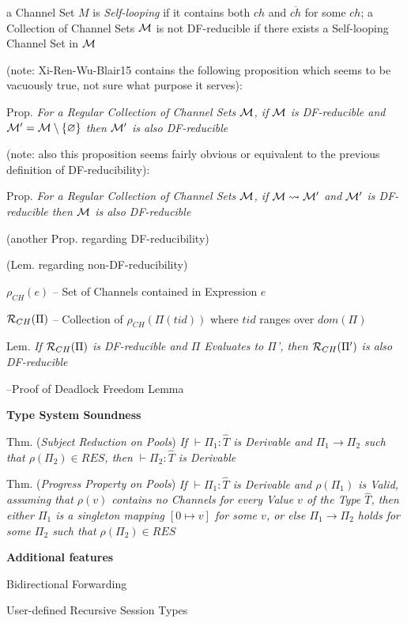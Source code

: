 a Channel Set $M$ is \emph{Self-looping} if it contains both $ch$ and
$\overline{ch}$ for some $ch$; a Collection of Channel Sets
$\mathcal{M}$ is not DF-reducible if there exists a Self-looping Channel
Set in $\mathcal{M}$

(note: Xi-Ren-Wu-Blair15 contains the following proposition which
seems to be vacuously true, not sure what purpose it serves):

Prop. \emph{For a Regular Collection of Channel Sets $\mathcal{M}$, if
  $\mathcal{M}$ is DF-reducible and $\mathcal{M}' =
  \mathcal{M}\setminus\{\varnothing\}$ then $\mathcal{M}'$ is also
  DF-reducible}

(note: also this proposition seems fairly obvious or equivalent to the
previous definition of DF-reducibility):

Prop. \emph{For a Regular Collection of Channel Sets $\mathcal{M}$, if
  $\mathcal{M} \rightsquigarrow \mathcal{M}'$ and $\mathcal{M}'$ is
  DF-reducible then $\mathcal{M}$ is also DF-reducible}

(another Prop. regarding DF-reducibility) %

(Lem. regarding non-DF-reducibility) %

$\rho_{CH}(e)$ -- Set of Channels contained in Expression $e$

$\mathcal{R}_{CH}(\Pi)$ -- Collection of $\rho_{CH}(\Pi(tid))$ where
$tid$ ranges over $dom(\Pi)$

Lem. \emph{If $\mathcal{R}_{CH}(\Pi)$ is DF-reducible and $\Pi$
  Evaluates to $\Pi$', then $\mathcal{R}_{CH}(\Pi')$ is also
  DF-reducible}

--Proof of Deadlock Freedom Lemma


\textbf{Type System Soundness}

Thm. (\emph{Subject Reduction on Pools}) \emph{If $\vdash \Pi_1 :
  \hat{T}$ is Derivable and $\Pi_1 \rightarrow \Pi_2$ such that
  $\rho(\Pi_2) \in RES$, then $\vdash \Pi_2 : \hat{T}$ is Derivable}

Thm. (\emph{Progress Property on Pools}) \emph{If $\vdash \Pi_1 :
  \hat{T}$ is Derivable and $\rho(\Pi_1)$ is Valid, assuming that
  $\rho(v)$ contains no Channels for every Value $v$ of the Type
  $\hat{T}$, then either $\Pi_1$ is a singleton mapping $[0 \mapsto
    v]$ for some $v$, or else $\Pi_1 \rightarrow \Pi_2$ holds for some
  $\Pi_2$ such that $\rho(\Pi_2) \in RES$}


\textbf{Additional features}

Bidirectional Forwarding

User-defined Recursive Session Types

